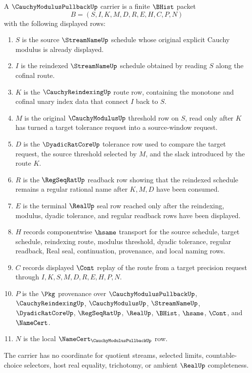 \begin{definition}
\label{def:cauchy-modulus-pullback-carrier}
A $\CauchyModulusPullbackUp$ carrier is a finite $\BHist$ packet
$$
B=(S,I,K,M,D,R,E,H,C,P,N)
$$
with the following displayed rows:
\begin{enumerate}
\item $S$ is the source $\StreamNameUp$ schedule whose original explicit Cauchy modulus is already displayed.
\item $I$ is the reindexed $\StreamNameUp$ schedule obtained by reading $S$ along the cofinal route.
\item $K$ is the $\CauchyReindexingUp$ route row, containing the monotone and cofinal unary index data that connect $I$ back to $S$.
\item $M$ is the original $\CauchyModulusUp$ threshold row on $S$, read only after $K$ has turned a target tolerance request into a source-window request.
\item $D$ is the $\DyadicRatCoreUp$ tolerance row used to compare the target request, the source threshold selected by $M$, and the slack introduced by the route $K$.
\item $R$ is the $\RegSeqRatUp$ readback row showing that the reindexed schedule remains a regular rational name after $K,M,D$ have been consumed.
\item $E$ is the terminal $\RealUp$ seal row reached only after the reindexing, modulus, dyadic tolerance, and regular readback rows have been displayed.
\item $H$ records componentwise $\hsame$ transport for the source schedule, target schedule, reindexing route, modulus threshold, dyadic tolerance, regular readback, Real seal, continuation, provenance, and local naming rows.
\item $C$ records displayed $\Cont$ replay of the route from a target precision request through $I,K,S,M,D,R,E,H,P,N$.
\item $P$ is the $\Pkg$ provenance over $\CauchyModulusPullbackUp$, $\CauchyReindexingUp$, $\CauchyModulusUp$, $\StreamNameUp$, $\DyadicRatCoreUp$, $\RegSeqRatUp$, $\RealUp$, $\BHist$, $\hsame$, $\Cont$, and $\NameCert$.
\item $N$ is the local $\NameCert_{\CauchyModulusPullbackUp}$ row.
\end{enumerate}
The carrier has no coordinate for quotient streams, selected limits, countable-choice selectors, host real equality, trichotomy, or ambient $\RealUp$ completeness.
\end{definition}

